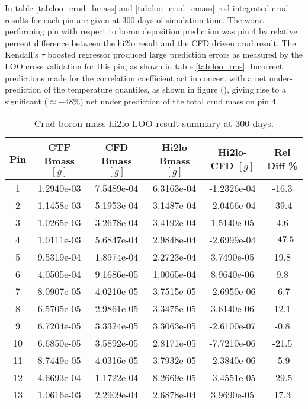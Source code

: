In table \ref{tab:loo_crud_bmass} and \ref{tab:loo_crud_cmass} rod integrated crud results for each pin are given at 300 days of simulation time.  The worst performing pin with respect to boron deposition prediction was pin 4 by relative percent difference between the hi2lo result and the CFD driven crud result.  The Kendall's $\tau$ boosted regressor produced large prediction errors as measured by the LOO cross validation for this pin, as shown in table \ref{tab:loo_rms}.  Incorrect predictions made for the correlation coefficient act in concert with a net under-prediction of the temperature quantiles, as shown in figure (), giving rise to a significant ($\approx -48\%$) net under prediction of the total crud mass on pin 4.


\begin{table}[h]
    \begin{center}
    \caption[Hi2lo crud boron mass results]{Crud boron mass hi2lo LOO result summary at 300 days.}
    \begin{tabular}[h]{|c|c|c|c|c|c|}
        \hline
        Pin & CTF Bmass $[g]$ & CFD Bmass $[g]$ & Hi2lo Bmass $[g]$ & Hi2lo-CFD $[g]$ & Rel Diff \% \\
\hline
1  & 1.2940e-03 & 7.5489e-04 & 6.3163e-04 & -1.2326e-04 &  -16.3 \\
2  & 1.1458e-03 & 5.1953e-04 & 3.1487e-04 & -2.0466e-04 &  -39.4 \\
3  & 1.0265e-03 & 3.2678e-04 & 3.4192e-04 & 1.5140e-05 &  4.6 \\ 
4  & 1.0111e-03 & 5.6847e-04 & 2.9848e-04 & -2.6999e-04 &  $\bf{-47.5}$ \\
5  & 9.5319e-04 & 1.8974e-04 & 2.2723e-04 & 3.7490e-05 &  19.8 \\ 
6  & 4.0505e-04 & 9.1686e-05 & 1.0065e-04 & 8.9640e-06 &  9.8 \\ 
7  & 8.0907e-05 & 4.0210e-05 & 3.7515e-05 & -2.6950e-06 &  -6.7 \\
8  & 6.5705e-05 & 2.9861e-05 & 3.3475e-05 & 3.6140e-06 &  12.1 \\ 
9  & 6.7204e-05 & 3.3324e-05 & 3.3063e-05 & -2.6100e-07 &  -0.8 \\
10  &6.6850e-05 & 3.5892e-05 & 2.8171e-05 & -7.7210e-06 &  -21.5 \\
11  &8.7449e-05 & 4.0316e-05 & 3.7932e-05 & -2.3840e-06 &  -5.9 \\
12  &4.6693e-04 & 1.1722e-04 & 8.2669e-05 & -3.4551e-05 &  -29.5 \\
13  &1.0616e-03 & 2.2909e-04 & 2.6878e-04 & 3.9690e-05 &  17.3 \\ 

\end{tabular}
\end{center}
\end{table}
